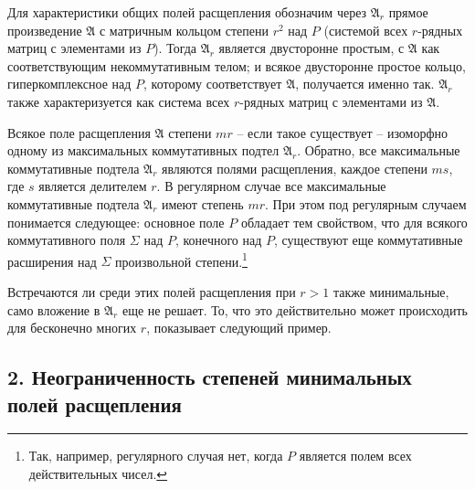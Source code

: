 \documentclass[11pt]{article}
\newcommand{\mA}{\mathfrak{A}}
\begin{document}
\noindent Для характеристики общих полей расщепления обозначим через $\mA_r$ прямое произведение $\mA$ с матричным кольцом степени $r^2$ над $P$ (системой всех $r$-рядных матриц с элементами из $P$). Тогда $\mA_r$ является двусторонне простым, с $\mA$ как соответствующим некоммутативным телом; и всякое двусторонне простое кольцо, гиперкомплексное над $P$, которому соответствует $\mA$, получается именно так. $\mA_r$ также характеризуется как система всех $r$-рядных матриц с элементами из $\mA$.

\medskip

\noindent Всякое поле расщепления $\mA$ степени $mr$ -- если такое существует -- изоморфно одному из максимальных коммутативных подтел $\mA_r$. Обратно, все максимальные коммутативные подтела $\mA_r$ являются полями расщепления, каждое степени $ms$, где $s$ является делителем $r$. В регулярном случае все максимальные коммутативные подтела $\mA_r$ имеют степень $mr$. При этом под регулярным случаем понимается следующее: основное поле $P$ обладает тем свойством, что для всякого коммутативного поля $\Sigma$ над $P$, конечного над $P$, существуют еще коммутативные расширения над $\Sigma$ произвольной степени.\footnote{Так, например, регулярного случая нет, когда $P$ является полем всех действительных чисел.}

\medskip

\noindent Встречаются ли среди этих полей расщепления при $r>1$ также минимальные, само вложение в $\mA_r$ еще не решает. То, что это действительно может происходить для бесконечно многих $r$, показывает следующий пример.

\subsection*{2. Неограниченность степеней минимальных полей расщепления}
\end{document}
